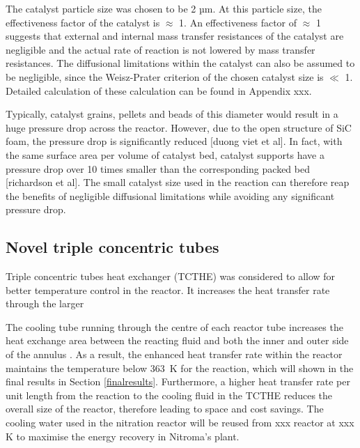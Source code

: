 The catalyst particle size was chosen to be 2 µm. At this particle size, the effectiveness factor of the catalyst is $\approx$ 1. An effectiveness factor of $\approx$ 1 suggests that external and internal mass transfer resistances of the catalyst are negligible and the actual rate of reaction is not lowered by mass transfer resistances. The diffusional limitations within the catalyst can also be assumed to be negligible, since the Weisz-Prater criterion of the chosen catalyst size is $\ll$ 1. Detailed calculation of these calculation can be found in Appendix xxx.

Typically, catalyst grains, pellets and beads of this diameter would result in a huge pressure drop across the reactor. However, due to the open structure of SiC foam, the pressure drop is significantly reduced [duong viet et al]. In fact, with the same surface area per volume of catalyst bed, catalyst supports have a pressure drop over 10 times smaller than the corresponding packed bed [richardson et al]. The small catalyst size used in the reaction can therefore reap the benefits of negligible diffusional limitations while avoiding any significant pressure drop.



\subsection{Novel triple concentric tubes}
\label{sec:tripleconctube}
Triple concentric tubes heat exchanger (TCTHE) was considered to allow for better temperature control in the reactor. 
It increases the heat transfer rate through the larger 

The cooling tube running through the centre of each reactor tube increases the heat exchange area between the reacting fluid and both the inner and outer side of the annulus \cite{moya-rico_characterization_2019}. As a result, the enhanced heat transfer rate within the reactor maintains the temperature below \SI{363}{\K} for the reaction, which will shown in the final results in Section \ref{finalresults}. Furthermore, a higher heat transfer rate per unit length from the reaction to the cooling fluid in the TCTHE reduces the overall size of the reactor, therefore leading to space and cost savings. The cooling water used in the nitration reactor will be reused from xxx reactor at xxx K to maximise the energy recovery in Nitroma's plant. 

